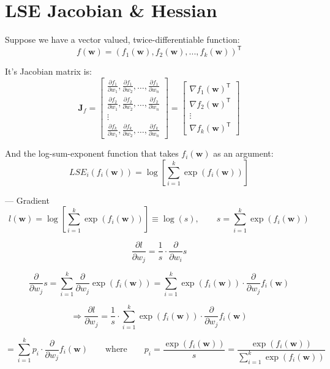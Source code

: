 \section{LSE Jacobian \& Hessian}
\label{app:lse}
Suppose we have a vector valued, twice-differentiable function: 
$$f(\mathbf{w})=(f_1(\mathbf{w}), f_2(\mathbf{w}),...,f_k(\mathbf{w}))^{\mathsf{T}}$$

It's Jacobian matrix is:
$$\mathbf{J}_f=\begin{bmatrix} \frac{\partial f_1}{\partial w_{1}}, \frac{\partial f_1}{\partial w_{2}}, \dots,\frac{\partial f_1}{\partial w_{n}} \\ \frac{\partial f_2}{\partial w_{1}}, \frac{\partial f_2}{\partial w_{2}}, \dots,\frac{\partial f_2}{\partial w_{n}} \\ \vdots \\ \frac{\partial f_k}{\partial w_{1}}, \frac{\partial f_k}{\partial w_{2}}, \dots,\frac{\partial f_k}{\partial w_{n}}\end{bmatrix} = \begin{bmatrix} \nabla f_1(\mathbf{w})^{\mathsf{T}}\\ \nabla f_2(\mathbf{w})^{\mathsf{T}} \\ \vdots \\ \nabla f_k(\mathbf{w})^{\mathsf{T}}\end{bmatrix}$$

And the log-sum-exponent function that takes $f_i(\mathbf{w})$ as an argument:
$$LSE_i(f_i(\mathbf{w}))=\log{\left[\sum_{i=1}^{k}\exp(f_i(\mathbf{w}))\right]}$$

---
Gradient
$$l(\mathbf{w})=\log{\left[\sum_{i=1}^{k}\exp(f_i(\mathbf{w}))\right]}\equiv \log(s), \qquad s=\sum_{i=1}^{k}\exp(f_i(\mathbf{w}))$$

$$\frac{\partial l}{\partial w_j}=\frac{1}{s}\cdot\frac{\partial}{\partial w_i}s$$

$$\frac{\partial}{\partial w_j}s=\sum_{i=1}^{k}\frac{\partial}{\partial w_j}\exp(f_i(\mathbf{w}))=\sum_{i=1}^{k}\exp(f_i(\mathbf{w}))\cdot\frac{\partial}{\partial w_j}f_i(\mathbf{w})$$

$$\Longrightarrow\frac{\partial l}{\partial w_j}=\frac{1}{s}\cdot\sum_{i=1}^{k}\exp(f_i(\mathbf{w}))\cdot\frac{\partial}{\partial w_j}f_i(\mathbf{w})$$

$$=\sum_{i=1}^{k}p_i\cdot\frac{\partial}{\partial w_j}f_i(\mathbf{w})\qquad\text{where}\qquad p_i=\frac{\exp( f_i(\mathbf{w}))}{s}=\frac{{\exp( f_i(\mathbf{w}))}}{\sum_{i=1}^{k}\exp (f_i(\mathbf{w}))}$$

